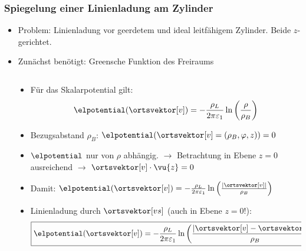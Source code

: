 \begin{frame}
  \frametitle{Spiegelung einer Linienladung am Zylinder}

  \begin{itemize}[<+->]
  \item Problem: Linienladung vor geerdetem und ideal leitfähigem Zylinder. Beide $z$-gerichtet.
    \item Zunächst benötigt: \alert{Greensche Funktion des Freiraums}
    \end{itemize}
\pause
    \begin{columns}
      \begin{column}{.35\textwidth}
\end{column}
\begin{column}{.55\textwidth}
\pause
  \begin{itemize}[<+->]
  \item Für das Skalarpotential gilt:
    \begin{equation*}
      \elpotential(\ortsvektor[v]) = -\frac{\rho_L}{2\pi\varepsilon_1} \ln\left(\frac{\rho}{\rho_B} \right)
    \end{equation*}
  \item Bezugsabstand $\rho_B$: $\elpotential(\ortsvektor[v]=(\rho_B,\varphi,z)) = 0$
  \item $\elpotential$ nur von $\rho$ abhängig. $\to$ Betrachtung in Ebene $z=0$ ausreichend $\to$ $\ortsvektor[v]\cdot \vu{z} = 0$
  \item Damit: $\elpotential(\ortsvektor[v]) = -\frac{\rho_L}{2\pi\varepsilon_1} \ln\left(\frac{\left|\ortsvektor[v]\right|}{\rho_B} \right)$
  \item Linienladung durch $\ortsvektor[vs]$ (auch in Ebene $z=0$!):
    \begin{equation*}
      \boxed{\elpotential(\ortsvektor[v]) = -\frac{\rho_L}{2\pi\varepsilon_1} \ln\left(\frac{\left|\ortsvektor[v]-\ortsvektor[vs]\right|}{\rho_B} \right)}
      \end{equation*}
\end{itemize}
  \end{column}
\end{columns}
\end{frame}

